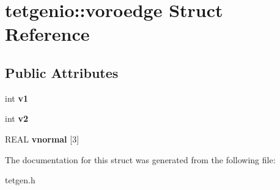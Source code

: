 \hypertarget{structtetgenio_1_1voroedge}{}\section{tetgenio\+:\+:voroedge Struct Reference}
\label{structtetgenio_1_1voroedge}
\subsection*{Public Attributes}
\begin{DoxyCompactItemize}
\item 
\mbox{\label{structtetgenio_1_1voroedge_a2c18bda2392af5f81bc790a2c0ea3139}} 
int {\bfseries v1}
\item 
\mbox{\label{structtetgenio_1_1voroedge_a19a27882ca68a89123965f7b08e05d55}} 
int {\bfseries v2}
\item 
\mbox{\label{structtetgenio_1_1voroedge_afea78ad75784a868068e6d86c21531a3}} 
R\+E\+AL {\bfseries vnormal} \mbox{[}3\mbox{]}
\end{DoxyCompactItemize}


The documentation for this struct was generated from the following file\+:\begin{DoxyCompactItemize}
\item 
tetgen.\+h\end{DoxyCompactItemize}
